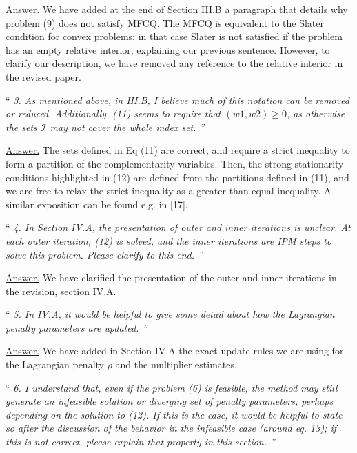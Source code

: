 \documentclass[10pt,a4paper]{article}
\newenvironment{quotereviewer}{\vspace{.5cm}{\underline\reviewername} ``\it\footnotesize}{''}
\newcommand{\answer}{\vspace{1mm}\underline{Answer.} }
\begin{document}
\answer
We have added at the end of Section III.B a paragraph that details why problem (9)
does not satisfy MFCQ. The MFCQ is equivalent to the Slater condition for convex problems:
in that case Slater is not satisfied if the problem has an empty relative interior, explaining
our previous sentence. However, to clarify our description, we have removed any reference to the relative
interior in the revised paper.

\begin{quotereviewer}
3. As mentioned above, in III.B, I believe much of this notation can be removed or reduced. Additionally, (11) seems to require that $(w1,w2) \geq 0$, as otherwise the sets $\mathcal{I}$ may not cover the whole index set.
\end{quotereviewer}

\answer
The sets defined in Eq (11) are correct, and require a strict inequality to form
a partition of the complementarity variables. Then, the strong stationarity conditions
highlighted in (12) are defined from the partitions defined in (11), and we are free
to relax the strict inequality as a greater-than-equal inequality.
A similar exposition can be found e.g. in [17].

\begin{quotereviewer}
4. In Section IV.A, the presentation of outer and inner iterations is unclear. At each outer iteration, (12) is solved, and the inner iterations are IPM steps to solve this problem. Please clarify to this end.
\end{quotereviewer}

\answer
We have clarified the presentation of the outer and inner iterations
in the revision, section IV.A.

\begin{quotereviewer}
 5. In IV.A, it would be helpful to give some detail about how the Lagrangian penalty parameters are updated.
\end{quotereviewer}

\answer
We have added in Section IV.A the exact update rules we are using for the Lagrangian
 penalty $\rho$ and the multiplier estimates.

\begin{quotereviewer}
 6. I understand that, even if the problem (6) is feasible, the method may still generate an infeasible solution or diverging set of penalty parameters, perhaps depending on the solution to (12). If this is the case, it would be helpful to state so after the discussion of the behavior in the infeasible case (around eq. 13); if this is not correct, please explain that property in this section.
\end{quotereviewer}
\end{document}
